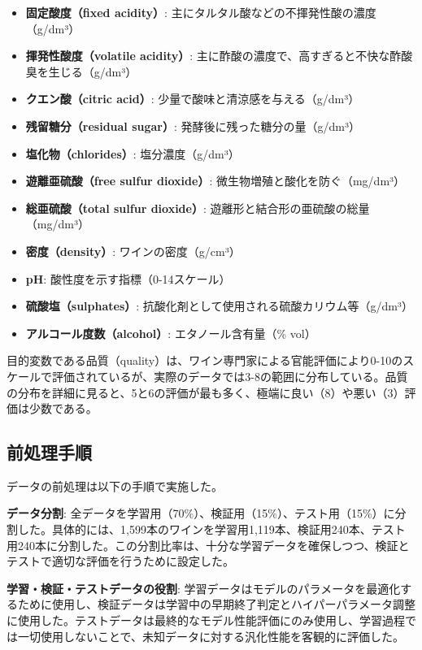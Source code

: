 \documentclass[12pt,a4paper,dvipdfmx]{jsarticle}
\begin{document}
\begin{itemize}
    \item \textbf{固定酸度（fixed acidity）}: 主にタルタル酸などの不揮発性酸の濃度（g/dm³）
    \item \textbf{揮発性酸度（volatile acidity）}: 主に酢酸の濃度で、高すぎると不快な酢酸臭を生じる（g/dm³）
    \item \textbf{クエン酸（citric acid）}: 少量で酸味と清涼感を与える（g/dm³）
    \item \textbf{残留糖分（residual sugar）}: 発酵後に残った糖分の量（g/dm³）
    \item \textbf{塩化物（chlorides）}: 塩分濃度（g/dm³）
    \item \textbf{遊離亜硫酸（free sulfur dioxide）}: 微生物増殖と酸化を防ぐ（mg/dm³）
    \item \textbf{総亜硫酸（total sulfur dioxide）}: 遊離形と結合形の亜硫酸の総量（mg/dm³）
    \item \textbf{密度（density）}: ワインの密度（g/cm³）
    \item \textbf{pH}: 酸性度を示す指標（0-14スケール）
    \item \textbf{硫酸塩（sulphates）}: 抗酸化剤として使用される硫酸カリウム等（g/dm³）
    \item \textbf{アルコール度数（alcohol）}: エタノール含有量（\% vol）
\end{itemize}

目的変数である品質（quality）は、ワイン専門家による官能評価により0-10のスケールで評価されているが、実際のデータでは3-8の範囲に分布している。品質の分布を詳細に見ると、5と6の評価が最も多く、極端に良い（8）や悪い（3）評価は少数である。

\subsection{前処理手順}

データの前処理は以下の手順で実施した。

\textbf{データ分割}: 全データを学習用（70\%）、検証用（15\%）、テスト用（15\%）に分割した。具体的には、1,599本のワインを学習用1,119本、検証用240本、テスト用240本に分割した。この分割比率は、十分な学習データを確保しつつ、検証とテストで適切な評価を行うために設定した。

\textbf{学習・検証・テストデータの役割}: 学習データはモデルのパラメータを最適化するために使用し、検証データは学習中の早期終了判定とハイパーパラメータ調整に使用した。テストデータは最終的なモデル性能評価にのみ使用し、学習過程では一切使用しないことで、未知データに対する汎化性能を客観的に評価した。
\end{document}
